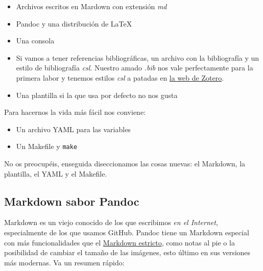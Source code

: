 \begin{itemize}
\item
  Archivos escritos en Mardown con extensión \emph{md}
\item
  Pandoc y una distribución de LaTeX
\item
  Una consola
\item
  Si vamos a tener referencias bibliográficas, un archivo con la
  bibliografía y un estilo de bibliografía \emph{csl}. Nuestro amado
  \emph{.bib} nos vale perfectamente para la primera labor y tenemos
  estilos \emph{csl} a patadas en
  \href{https://www.zotero.org/styles}{la web de Zotero}.
\item
  Una plantilla si la que usa por defecto no nos gusta
\end{itemize}

Para hacernos la vida más fácil nos conviene:

\begin{itemize}
\item
  Un archivo YAML para las variables
\item
  Un Makefile y \lstinline!make!
\end{itemize}

No os preocupéis, enseguida diseccionamos las cosas nuevas: el Markdown,
la plantilla, el YAML y el Makefile.

\subsection{Markdown sabor Pandoc}

Markdown es un viejo conocido de los que escribimos \emph{en el
Internet}, especialmente de los que usamos GitHub. Pandoc tiene un
Markdown especial con más funcionalidades que el
\href{https://daringfireball.net/projects/markdown/}{Markdown estricto},
como notas al pie o la posibilidad de cambiar el tamaño de las imágenes,
esto último en sus versiones más modernas. Va un resumen rápido:

